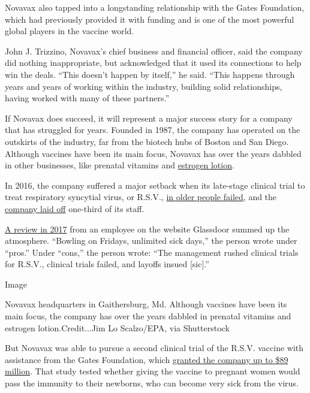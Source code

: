 Novavax also tapped into a longstanding relationship with the Gates
Foundation, which had previously provided it with funding and is one of
the most powerful global players in the vaccine world.

John J. Trizzino, Novavax's chief business and financial officer, said
the company did nothing inappropriate, but acknowledged that it used its
connections to help win the deals. ``This doesn't happen by itself,'' he
said. ``This happens through years and years of working within the
industry, building solid relationships, having worked with many of these
partners.''

If Novavax does succeed, it will represent a major success story for a
company that has struggled for years. Founded in 1987, the company has
operated on the outskirts of the industry, far from the biotech hubs of
Boston and San Diego. Although vaccines have been its main focus,
Novavax has over the years dabbled in other businesses, like prenatal
vitamins and
\href{https://www.washingtonpost.com/archive/business/2003/10/11/novavaxs-estrogen-lotion-is-approved/53bc53d2-de8e-4c95-a1f0-8b05b3bcd6d0/}{estrogen
lotion}.

In 2016, the company suffered a major setback when its late-stage
clinical trial to treat respiratory syncytial virus, or R.S.V.,
\href{https://ir.novavax.com/news-releases/news-release-details/novavax-announces-topline-rsv-f-vaccine-data-two-clinical-trials}{in
older people failed}, and the
\href{https://endpts.com/crushed-by-a-phiii-flop-novavax-slashes-jobs-as-it-looks-to-chop-out-up-to-100m-in-costs/}{company
laid off} one-third of its staff.

\href{https://www.glassdoor.com.hk/Reviews/Novavax-let-go-Reviews-EI_IE5710.0,7_KH8,14.htm}{A
review in 2017} from an employee on the website Glassdoor summed up the
atmosphere. ``Bowling on Fridays, unlimited sick days,'' the person
wrote under ``pros.'' Under ``cons,'' the person wrote: ``The management
rushed clinical trials for R.S.V., clinical trials failed, and layoffs
insued {[}sic{]}.''

Image

Novavax headquarters in Gaithersburg, Md. Although vaccines have been
its main focus, the company has over the years dabbled in prenatal
vitamins and estrogen lotion.Credit...Jim Lo Scalzo/EPA, via
Shutterstock

But Novavax was able to pursue a second clinical trial of the R.S.V.
vaccine with assistance from the Gates Foundation, which
\href{https://ir.novavax.com/news-releases/news-release-details/novavax-announces-grant-89-million-support-development-rsv-f}{granted
the company up to \$89 million}. That study tested whether giving the
vaccine to pregnant women would pass the immunity to their newborns, who
can become very sick from the virus.

